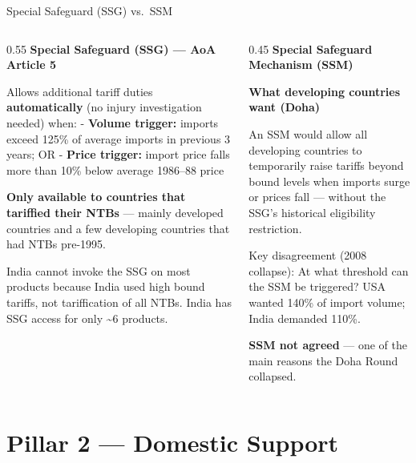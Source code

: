 \documentclass[
  ignorenonframetext,
  aspectratio=169,
]{beamer}
\makeatletter
\let\quarto@originallabel\label
\DeclareRobustCommand*{\label}[1]{\quarto@originallabel{#1}}
\makeatother
\begin{document}
\begin{frame}{Special Safeguard (SSG) vs.~SSM}
\label{special-safeguard-ssg-vs.-ssm}
\begin{columns}[T]
\begin{column}{0.55\linewidth}
\textbf{Special Safeguard (SSG) --- AoA Article 5}

Allows additional tariff duties \textbf{automatically} (no injury
investigation needed) when: - \textbf{Volume trigger:} imports exceed
125\% of average imports in previous 3 years; OR - \textbf{Price
trigger:} import price falls more than 10\% below average 1986--88 price

\textbf{Only available to countries that tariffied their NTBs} ---
mainly developed countries and a few developing countries that had NTBs
pre-1995.

India cannot invoke the SSG on most products because India used high
bound tariffs, not tariffication of all NTBs. India has SSG access for
only \textasciitilde6 products.
\end{column}

\begin{column}{0.45\linewidth}
\textbf{Special Safeguard Mechanism (SSM)}

\textbf{What developing countries want (Doha)}

An SSM would allow all developing countries to temporarily raise tariffs
beyond bound levels when imports surge or prices fall --- without the
SSG's historical eligibility restriction.

Key disagreement (2008 collapse): At what threshold can the SSM be
triggered? USA wanted 140\% of import volume; India demanded 110\%.

\textbf{SSM not agreed} --- one of the main reasons the Doha Round
collapsed.
\end{column}
\end{columns}
\end{frame}

\begin{frame}
\end{frame}

\section{Pillar 2 --- Domestic Support}\label{pillar-2-domestic-support}
\end{document}
